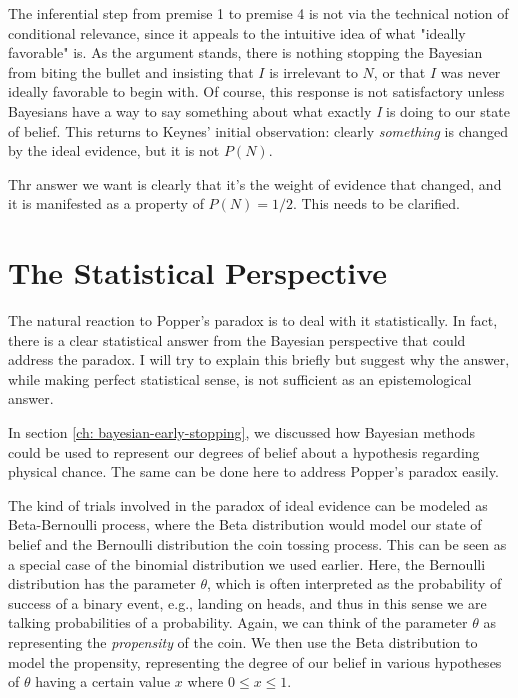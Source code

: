 The inferential step from premise 1 to premise 4 is not via the technical 
notion of conditional relevance, since it appeals to the intuitive idea of what "ideally favorable" is. As the argument stands, there is nothing stopping 
the Bayesian from biting the bullet and insisting that \(I\) is
irrelevant to \(N\), or that \(I\) was never ideally favorable to begin
with. Of course, this response is not satisfactory unless Bayesians have a way
to say something about what exactly \emph{I} is doing to our state of
belief. This returns to Keynes' initial observation: clearly
\emph{something} is changed by the ideal evidence, but it is not
\(P(N)\). 

Thr answer we want is clearly that it's the weight of evidence that changed,
and it is manifested as a property of \(P(N) = 1/2\). This needs to be clarified.

\hypertarget{the-statistical-perspective-1}{%
\section{The Statistical
Perspective}\label{the-statistical-perspective-1}}

The natural reaction to Popper's paradox is to deal with it statistically. In fact, there is a clear statistical answer from the Bayesian perspective that
could address the paradox. I will try to explain this briefly but
suggest why the answer, while making perfect statistical sense, is not
sufficient as an epistemological answer.

In section \ref{ch: bayesian-early-stopping}, we discussed how Bayesian methods could be used to represent
our degrees of belief about a hypothesis regarding physical chance. The
same can be done here to address Popper's paradox easily.

The kind of trials involved in the paradox of ideal evidence can be
modeled as Beta-Bernoulli process, where the Beta distribution would
model our state of belief and the Bernoulli distribution the coin
tossing process. This can be seen as a special case of the binomial
distribution we used earlier. Here, the Bernoulli distribution has the
parameter \(\theta\), which is often interpreted as the probability of
success of a binary event, e.g., landing on heads, and thus in this
sense we are talking probabilities of a probability. Again, we can think
of the parameter \(\theta\) as representing the \emph{propensity} of the
coin. We then use the Beta distribution to model the propensity,
representing the degree of our belief in various hypotheses of
\(\theta\) having a certain value \(x\) where \(0 \leq x \leq 1\).


